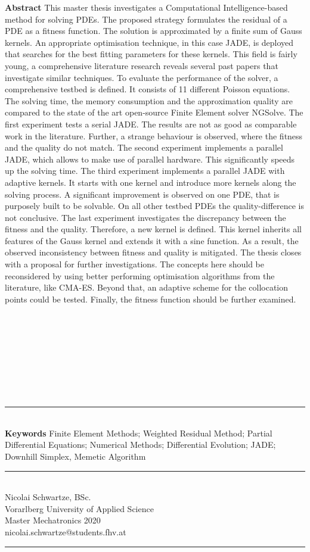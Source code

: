 \documentclass[./\jobname.tex]{subfiles}
\begin{document}
\textbf{Abstract} This master thesis investigates a Computational Intelligence-based method for solving PDEs. The proposed strategy formulates the residual of a PDE as a fitness function. The solution is approximated by a finite sum of Gauss kernels. An appropriate optimisation technique, in this case JADE, is deployed that searches for the best fitting parameters for these kernels. This field is fairly young, a comprehensive literature research reveals several past papers that investigate similar techniques. To evaluate the performance of the solver, a comprehensive testbed is defined. It consists of 11 different Poisson equations. The solving time, the memory consumption and the approximation quality are compared to the state of the art open-source Finite Element solver NGSolve. The first experiment tests a serial JADE. The results are not as good as comparable work in the literature. Further, a strange behaviour is observed, where the fitness and the quality do not match. The second experiment implements a parallel JADE, which allows to make use of parallel hardware. This significantly speeds up the solving time. The third experiment implements a parallel JADE with adaptive kernels. It starts with one kernel and introduce more kernels along the solving process. A significant improvement is observed on one PDE, that is purposely built to be solvable. On all other testbed PDEs the quality-difference is not conclusive. The last experiment investigates the discrepancy between the fitness and the quality. Therefore, a new kernel is defined. This kernel inherits all features of the Gauss kernel and extends it with a sine function. As a result, the observed inconsistency between fitness and quality is mitigated. The thesis closes with a proposal for further investigations. The concepts here should be reconsidered by using better performing optimisation algorithms from the literature, like CMA-ES. Beyond that, an adaptive scheme for the collocation points could be tested. Finally, the fitness function should be further examined.
\\~\\~\\~\\~\\~\\~\\~\\~\\
%
\noindent\rule{8.3cm}{0.4pt}

~\\
\textbf{Keywords} Finite Element Methods; Weighted Residual Method; Partial Differential Equations; Numerical Methods; Differential Evolution; JADE; Downhill Simplex, Memetic Algorithm\\

\noindent\rule{8.3cm}{0.4pt}

~\\
Nicolai Schwartze, BSc. \\
Vorarlberg University of Applied Science \\
Master Mechatronics 2020 \\
nicolai.schwartze@students.fhv.at \\

\noindent\rule{8.3cm}{0.4pt}


\newpage
\end{document}
